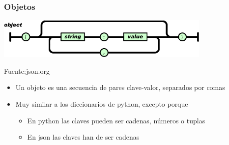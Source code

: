 \documentclass[ucs]{beamer}
\begin{document}
\begin{frame}[fragile]
\frametitle{Objetos}
\begin{center}
  \includegraphics[width=10.5cm]{figs/object}
\end{center}
\begin{flushright}
\begin{tiny}
Fuente:json.org
\end{tiny}
\end{flushright}
\begin{itemize}
\item 
Un objeto es una secuencia de pares clave-valor, separados por comas
\item
Muy similar a los diccionarios de python, excepto porque

\begin{itemize}
\item
En python las claves pueden ser cadenas, números o tuplas
\item
En json las claves han de ser cadenas
\end{itemize}
 
\end{itemize}
\end{frame}
\end{document}
